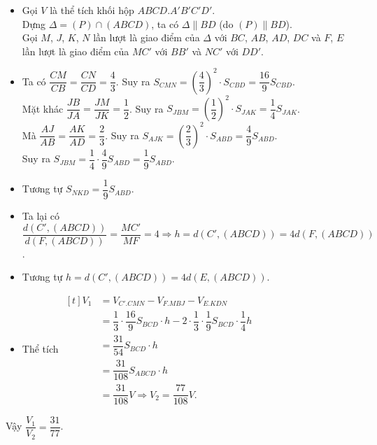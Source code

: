\begin{ex}
{\begin{center}
		\end{center}
		\begin{itemize}
			\item Gọi $V$ là thể tích khối hộp $ABCD.A'B'C'D'$.\\
			Dựng $\Delta =(P)\cap (ABCD)$, ta có $\Delta \parallel BD$ (do $(P)\parallel BD$).\\
			Gọi $M$, $J$, $K$, $N$ lần lượt là giao điểm của $\Delta$ với $BC$, $AB$, $AD$, $DC$ và $F$, $E$ lần lượt là giao điểm của $MC'$ với $BB'$ và $NC'$ với $DD'$.
			\item Ta có $\dfrac{CM}{CB}=\dfrac{CN}{CD}=\dfrac{4}{3}$. Suy ra $S_{CMN}=\left(\dfrac{4}{3}\right)^2\cdot{S_{CBD}}=\dfrac{16}{9}S_{CBD}$.\\
			Mặt khác $\dfrac{JB}{JA}=\dfrac{JM}{JK}=\dfrac{1}{2}$. Suy ra $S_{JBM}=\left(\dfrac{1}{2}\right)^2\cdot{S_{JAK}}=\dfrac{1}{4}S_{JAK}$.\\
			Mà $\dfrac{AJ}{AB}=\dfrac{AK}{AD}=\dfrac{2}{3}$. Suy ra $S_{AJK}=\left(\dfrac{2}{3}\right)^2\cdot{S_{ABD}}=\dfrac{4}{9}S_{ABD}$.\\ Suy ra $S_{JBM}=\dfrac{1}{4}\cdot \dfrac{4}{9}S_{ABD}=\dfrac{1}{9}S_{ABD}$.\\
			\item Tương tự $S_{NKD}=\dfrac{1}{9}S_{ABD}$.\\
			\item Ta lại có $\dfrac{d\left(C',\left(ABCD\right)\right)}{d\left(F,\left(ABCD\right)\right)}=\dfrac{MC'}{MF}=4\Rightarrow h=d\left(C',\left(ABCD\right)\right)=4d\left(F,\left(ABCD\right)\right)$.\\
			\item Tương tự $h=d\left(C', (ABCD)\right)=4d\left(E, (ABCD)\right)$.\\
			\item Thể tích $\begin{aligned}[t]
				V_1&=V_{C'.CMN}-V_{F.MBJ}-V_{E.KDN}\\
				&=\dfrac{1}{3}\cdot \dfrac{16}{9}S_{BCD}\cdot h-2\cdot \dfrac{1}{3}\cdot \dfrac{1}{9}S_{BCD}\cdot \dfrac{1}{4}h\\
				&=\dfrac{31}{54}S_{BCD}\cdot h\\
				&=\dfrac{31}{108}S_{ABCD}\cdot h\\
				&=\dfrac{31}{108}V\Rightarrow V_2=\dfrac{77}{108}V.\end{aligned}$
		\end{itemize}
		Vậy $\dfrac{V_1}{V_2}=\dfrac{31}{77}$.}
\end{ex}

